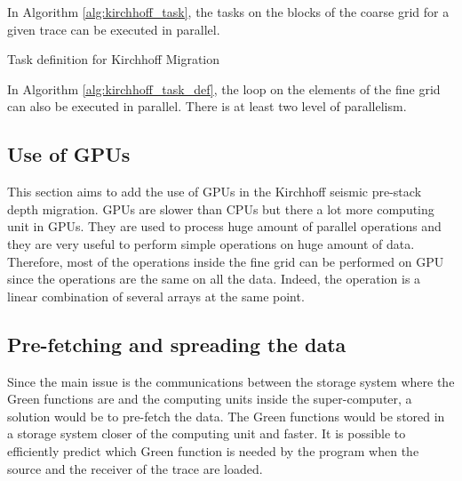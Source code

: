 In Algorithm \ref{alg:kirchhoff_task}, the tasks on the blocks of the coarse grid for a given trace can be executed in parallel.

\begin{algorithm}[h]
	\DontPrintSemicolon
	\SetAlgoVlined
	\caption{Task definition for Kirchhoff Migration \label{alg:kirchhoff_task_def}}

\end{algorithm}

In Algorithm \ref{alg:kirchhoff_task_def}, the loop on the elements of the fine grid can also be executed in parallel.
There is at least two level of parallelism.


\subsection{Use of GPUs}
This section aims to add the use of GPUs in the Kirchhoff seismic pre-stack depth migration.
GPUs are slower than CPUs but there a lot more computing unit in GPUs.
They are used to process huge amount of parallel operations and they are very useful to perform simple operations on huge amount of data.
Therefore, most of the operations inside the fine grid can be performed on GPU since the operations are the same on all the data.
Indeed, the operation is a linear combination of several arrays at the same point.

\subsection{Pre-fetching and spreading the data}
Since the main issue is the communications between the storage system where the Green functions are and the computing units inside the super-computer, a solution would be to pre-fetch the data.
The Green functions would be stored in a storage system closer of the computing unit and faster.
It is possible to efficiently predict which Green function is needed by the program when the source and the receiver of the trace are loaded.

